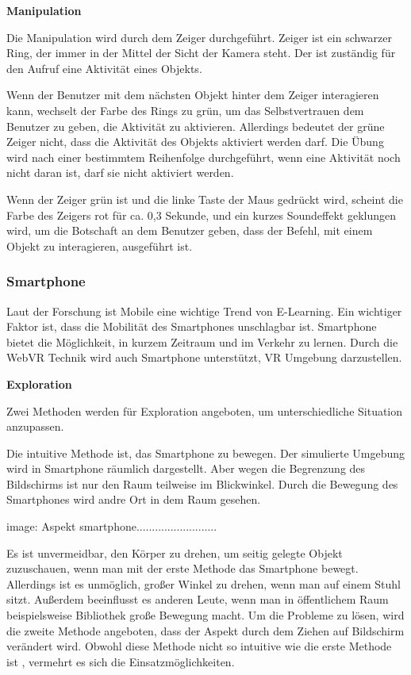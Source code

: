   \textbf{Manipulation}
  
  Die Manipulation wird durch dem Zeiger durchgeführt. Zeiger ist ein schwarzer Ring, der immer in der Mittel der Sicht der Kamera steht. Der ist zuständig für den Aufruf eine Aktivität eines Objekts.
  
  Wenn der Benutzer mit dem nächsten Objekt hinter dem Zeiger interagieren kann, wechselt der Farbe des Rings zu grün, um das Selbstvertrauen dem Benutzer zu geben, die Aktivität zu aktivieren. Allerdings bedeutet der grüne Zeiger nicht, dass die Aktivität des Objekts aktiviert werden darf. Die Übung wird nach einer bestimmtem Reihenfolge durchgeführt, wenn eine Aktivität noch nicht daran ist, darf sie nicht aktiviert werden.
  
  Wenn der Zeiger grün ist und die linke Taste der Maus gedrückt wird, scheint die Farbe des Zeigers rot für ca. 0,3 Sekunde, und ein kurzes Soundeffekt geklungen wird, um die Botschaft an dem Benutzer geben, dass der Befehl, mit einem Objekt zu interagieren, ausgeführt ist. 
  
 \subsubsection{Smartphone}
 Laut der Forschung ist Mobile eine wichtige Trend von E-Learning. Ein wichtiger Faktor ist, dass die Mobilität des Smartphones unschlagbar ist. Smartphone bietet die Möglichkeit, in kurzem Zeitraum und im Verkehr zu lernen. Durch die WebVR Technik wird auch Smartphone unterstützt, VR Umgebung darzustellen.
 
  \textbf{Exploration}
  
  Zwei Methoden werden für Exploration angeboten, um unterschiedliche Situation anzupassen.
  
  Die intuitive Methode ist, das Smartphone zu bewegen. Der simulierte Umgebung wird in Smartphone räumlich dargestellt. Aber wegen die Begrenzung des Bildschirms ist nur den Raum teilweise im Blickwinkel. Durch die Bewegung des Smartphones wird andre Ort in dem Raum gesehen.
  
  image: Aspekt smartphone..........................
  
  Es ist unvermeidbar, den Körper zu drehen, um seitig gelegte Objekt zuzuschauen, wenn man mit der erste Methode das Smartphone bewegt. Allerdings ist es unmöglich, großer Winkel zu drehen, wenn man auf einem Stuhl sitzt. Außerdem beeinflusst es anderen Leute, wenn man in öffentlichem Raum beispielsweise Bibliothek große Bewegung macht. Um die Probleme zu lösen, wird die zweite Methode angeboten, dass der Aspekt durch dem Ziehen auf Bildschirm verändert wird. Obwohl diese Methode nicht so intuitive wie die erste Methode ist , vermehrt es sich die Einsatzmöglichkeiten.
  
